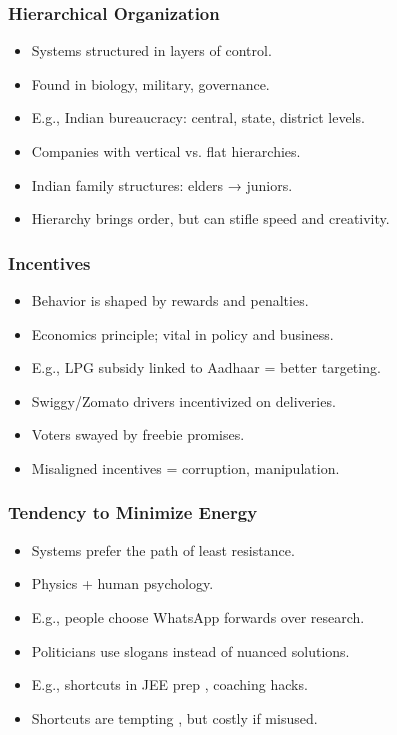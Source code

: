 \begin{frame}[fragile]\frametitle{Hierarchical Organization}
  \begin{itemize}
    \item Systems structured in layers of control.
    \item Found in biology, military, governance.
    \item E.g., Indian bureaucracy: central, state, district levels.
    \item Companies with vertical vs. flat hierarchies.
    \item Indian family structures: elders → juniors.
    \item Hierarchy brings order, but can stifle speed and creativity.
  \end{itemize}
\end{frame}

\begin{frame}[fragile]\frametitle{Incentives}
  \begin{itemize}
    \item Behavior is shaped by rewards and penalties.
    \item Economics principle; vital in policy and business.
    \item E.g., LPG subsidy linked to Aadhaar = better targeting.
    \item Swiggy/Zomato drivers incentivized on deliveries.
    \item Voters swayed by freebie promises.
    \item Misaligned incentives = corruption, manipulation.
  \end{itemize}
\end{frame}

\begin{frame}[fragile]\frametitle{Tendency to Minimize Energy}
  \begin{itemize}
    \item Systems prefer the path of least resistance.
    \item Physics + human psychology.
    \item E.g., people choose WhatsApp forwards over research.
    \item Politicians use slogans instead of nuanced solutions.
    \item E.g., shortcuts in JEE prep , coaching hacks.
    \item Shortcuts are tempting , but costly if misused.
  \end{itemize}
\end{frame}

